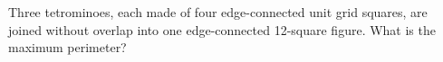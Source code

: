 Three tetrominoes, each made of four edge-connected unit grid squares, are joined without overlap into one edge-connected 12-square figure. What is the maximum perimeter?
